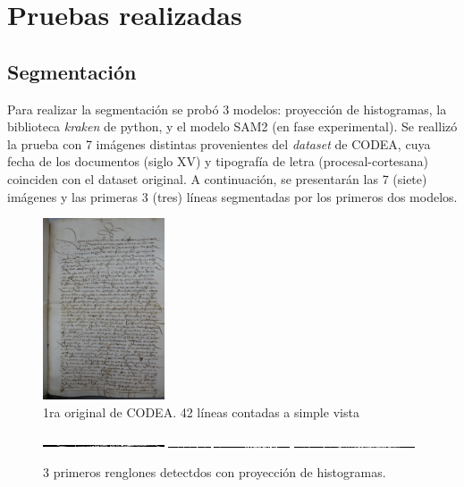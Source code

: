 \documentclass[11pt,a4paper]{article}
\begin{document}
\section{Pruebas realizadas}
\subsection{Segmentación}

Para realizar la segmentación se probó 3 modelos: proyección de histogramas, la biblioteca \textit{kraken} de python, y el modelo SAM2 (en fase experimental). Se reallizó la prueba con 7 imágenes distintas provenientes del \textit{dataset} de CODEA, cuya fecha de los documentos (siglo XV) y tipografía de letra (procesal-cortesana) coinciden con el dataset original. A continuación, se presentarán las 7 (siete) imágenes y las primeras 3 (tres) líneas segmentadas por los primeros dos modelos.\\

\begin{figure}[H] 
\centering 
\begin{minipage}{1.0\textwidth} 
\includegraphics[width=0.32\textwidth]{CODEA-0143_1r.jpg} 
\caption{1ra original de CODEA. 42 líneas contadas a simple vista} 
\label{fig:1ra CODEA} 
\end{minipage} 
\end{figure}

\begin{figure}[H] 
\centering 
\begin{minipage}{1.0\textwidth} 
\includegraphics[width=0.32\textwidth]{1_CODEA_1_PH.png} 
\includegraphics[width=0.32\textwidth]{1_CODEA_2_PH.png} 
\includegraphics[width=0.32\textwidth]{1_CODEA_3_PH.png} 
\caption{3 primeros renglones detectdos con proyección de histogramas.} 
\label{fig:3 líneas PH 1ra CODEA} 
\end{minipage} 
\end{figure}
\end{document}
